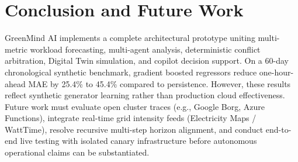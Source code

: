 \documentclass[conference]{IEEEtran}
\begin{document}
\section{Conclusion and Future Work}
GreenMind AI implements a complete architectural prototype uniting multi-metric workload forecasting, multi-agent analysis, deterministic conflict arbitration, Digital Twin simulation, and copilot decision support. On a 60-day chronological synthetic benchmark, gradient boosted regressors reduce one-hour-ahead MAE by 25.4\% to 45.4\% compared to persistence. However, these results reflect synthetic generator learning rather than production cloud effectiveness. Future work must evaluate open cluster traces (e.g., Google Borg, Azure Functions), integrate real-time grid intensity feeds (Electricity Maps / WattTime), resolve recursive multi-step horizon alignment, and conduct end-to-end live testing with isolated canary infrastructure before autonomous operational claims can be substantiated.
\end{document}
